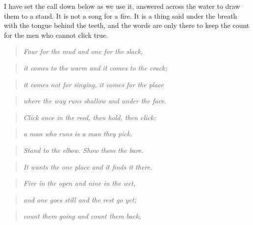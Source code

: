 \documentclass{design/chronicle}
\begin{document}
I have set the call down below as we use it, answered across the water to draw them to a stand. It is not a song for a fire. It is a thing said under the breath with the tongue behind the teeth, and the words are only there to keep the count for the men who cannot click true.

\begin{quote}\itshape Four for the mud and one for the slack,\end{quote}

\begin{quote}\itshape it comes to the warm and it comes to the crack;\end{quote}

\begin{quote}\itshape it comes not for singing, it comes for the place\end{quote}

\begin{quote}\itshape where the way runs shallow and under the face.\end{quote}

\begin{quote}\itshape \end{quote}

\begin{quote}\itshape Click once in the reed, then hold, then click:\end{quote}

\begin{quote}\itshape a man who runs is a man they pick.\end{quote}

\begin{quote}\itshape Stand to the elbow. Show them the bare.\end{quote}

\begin{quote}\itshape It wants the one place and it finds it there.\end{quote}

\begin{quote}\itshape \end{quote}

\begin{quote}\itshape Five in the open and nine in the wet,\end{quote}

\begin{quote}\itshape and one goes still and the rest go yet;\end{quote}

\begin{quote}\itshape count them going and count them back,\end{quote}
\end{document}

